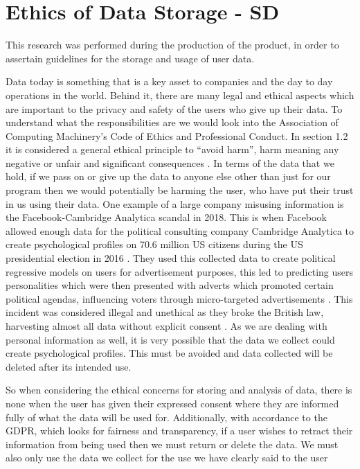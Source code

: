 \documentclass[11pt]{report}
\begin{document}
\section{Ethics of Data Storage - SD}

This research was performed during the production of the product, in order to assertain guidelines for the storage and usage of user data.\newline

Data today is something that is a key asset to companies and the day to day operations in the world. Behind it, there are many legal and ethical aspects which are important to the privacy and safety of the users who give up their data. To understand what the responsibilities are we would look into the Association of Computing  Machinery’s Code of Ethics and Professional Conduct. In section 1.2 it is considered a general ethical principle to “avoid harm”, harm meaning any negative or unfair and significant consequences \cite{ComputingMachineryACM2018}. In terms of the data that we hold, if we pass on or give up the data to anyone else other than just for our program then we would potentially be harming the user, who have put their trust in us using their data. One example of a large company misusing information is the Facebook-Cambridge Analytica scandal in 2018. This is when Facebook allowed enough data for the political consulting company Cambridge Analytica to create psychological profiles on 70.6 million US citizens during the US presidential election in 2016 \cite{Horwitz2018}. They used this collected data to create political regressive models on users for advertisement purposes, this led to predicting users personalities which were then presented with adverts which promoted certain political agendas, influencing voters through micro-targeted advertisements \cite{Rathi2019}. This incident was considered illegal and unethical as they broke the British law, harvesting almost all data without explicit consent \cite{ASNC2018}. As we are dealing with personal information as well, it is very possible that the data we collect could create psychological profiles. This must be avoided and data collected will be deleted after its intended use.

So when considering the ethical concerns for storing and analysis of data, there is none when the user has given their expressed consent where they are informed fully of what the data will be used for. Additionally, with accordance to the GDPR, which looks for fairness and transparency, if a user wishes to retract their information from being used then we must return or delete the data. We must also only use the data we collect for the use we have clearly said to the user
\end{document}
